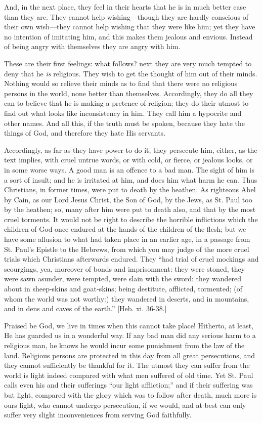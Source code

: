 And, in the next place, they feel in their hearts that he is in
much better case than they are. They cannot help wishing—though they
are hardly conscious of their own wish—they cannot help wishing that
they were like him; yet they have no intention of imitating him, and
this makes them jealous and envious. Instead of being angry with
themselves they are angry with him.

These are their first feelings: what follows? next they are very
much tempted to deny that he \emph{is} religious. They wish to get the
thought of him out of their minds. Nothing would so relieve their
minds as to find that there were no religious persons in the world,
none better than themselves. Accordingly, they do all they can to
believe that he is making a pretence of religion; they do their utmost
to find out what looks like inconsistency in him. They call him a
hypocrite and other names. And all this, if the truth must be spoken,
because they hate the things of God, and therefore they hate His
servants.

Accordingly, as far as they have power to do it, they persecute
him, either, as the text implies, with cruel untrue words, or with
cold, or fierce, or jealous looks, or in some worse ways. A good man
is an offence to a bad man. The sight of him is a sort of insult; and
he is irritated at him, and does him what harm he can. Thus
Christians, in former times, were put to death by the heathen. As
righteous Abel by Cain, as our Lord Jesus Christ, the Son of God, by
the Jews, as St. Paul too by the heathen; so, many after him were put
to death also, and that by the most cruel torments. It would not be
right to describe the horrible inflictions which the children of God
once endured at the hands of the children of the flesh; but we have
some allusion to what had taken place in an earlier age, in a passage
from St. Paul's Epistle to the Hebrews, from which you may judge of
the more cruel trials which Christians afterwards endured. They
``had trial of cruel mockings and scourgings, yea, moreover of
bonds and imprisonment: they were stoned, they were sawn asunder, were
tempted, were slain with the sword: they wandered about in sheep-skins
and goat-skins; being destitute, afflicted, tormented; (of whom the
world was not worthy:) they wandered in deserts, and in mountains, and
in dens and caves of the earth.'' [Heb. xi. 36-38.]

Praised be God, we live in times when this cannot take place!
Hitherto, at least, He has guarded us in a wonderful way. If any bad
man did any serious harm to a religious man, he knows he would incur
some punishment from the law of the land. Religious persons are
protected in this day from all great persecutions, and they cannot
sufficiently be thankful for it. The utmost they can suffer from the
world is light indeed compared with what men suffered of old time. Yet
St. Paul calls even his and their sufferings ``our light
affliction;'' and if their suffering was but light, compared with
the glory which was to follow after death, much more is ours light,
who cannot undergo persecution, if we would, and at best can only
suffer very slight inconveniences from serving God faithfully.

